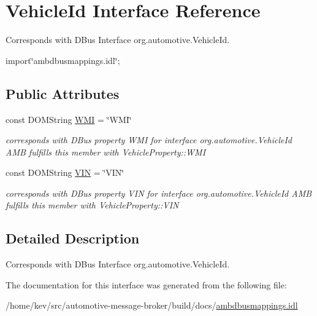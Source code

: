 \hypertarget{interfaceVehicleId}{\section{Vehicle\+Id Interface Reference}
\label{interfaceVehicleId}
}


Corresponds with D\+Bus Interface org.\+automotive.\+Vehicle\+Id.  




{\ttfamily import\char`\"{}ambdbusmappings.\+idl\char`\"{};}

\subsection*{Public Attributes}
\begin{DoxyCompactItemize}
\item 
\hypertarget{interfaceVehicleId_a975a5877bb5ffd2df7e778af11b741c7}{const D\+O\+M\+String \hyperlink{interfaceVehicleId_a975a5877bb5ffd2df7e778af11b741c7}{W\+M\+I} = \char`\"{}W\+M\+I\char`\"{}}\label{interfaceVehicleId_a975a5877bb5ffd2df7e778af11b741c7}

\begin{DoxyCompactList}\small\item\em corresponds with D\+Bus property W\+M\+I for interface org.\+automotive.\+Vehicle\+Id A\+M\+B fulfills this member with Vehicle\+Property\+::\+W\+M\+I \end{DoxyCompactList}\item 
\hypertarget{interfaceVehicleId_aabe466f31c84fcb81c6462ecdcc7ae3c}{const D\+O\+M\+String \hyperlink{interfaceVehicleId_aabe466f31c84fcb81c6462ecdcc7ae3c}{V\+I\+N} = \char`\"{}V\+I\+N\char`\"{}}\label{interfaceVehicleId_aabe466f31c84fcb81c6462ecdcc7ae3c}

\begin{DoxyCompactList}\small\item\em corresponds with D\+Bus property V\+I\+N for interface org.\+automotive.\+Vehicle\+Id A\+M\+B fulfills this member with Vehicle\+Property\+::\+V\+I\+N \end{DoxyCompactList}\end{DoxyCompactItemize}


\subsection{Detailed Description}
Corresponds with D\+Bus Interface org.\+automotive.\+Vehicle\+Id. 

The documentation for this interface was generated from the following file\+:\begin{DoxyCompactItemize}
\item 
/home/kev/src/automotive-\/message-\/broker/build/docs/\hyperlink{ambdbusmappings_8idl}{ambdbusmappings.\+idl}\end{DoxyCompactItemize}
